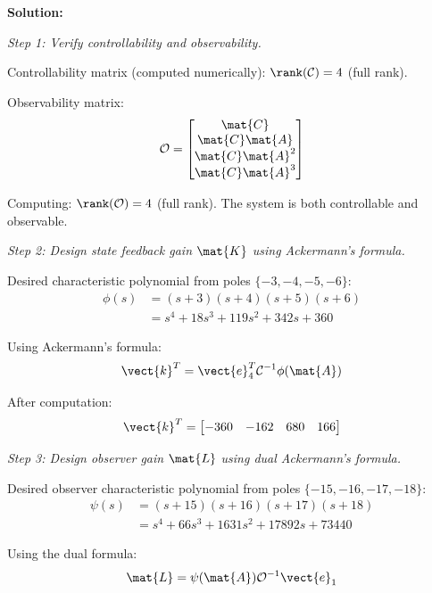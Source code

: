 \textbf{Solution:}

\textit{Step 1: Verify controllability and observability.}

Controllability matrix (computed numerically): $\rank(\mathcal{C}) = 4$ (full rank).

Observability matrix:
\begin{equation}
\mathcal{O} = \begin{bmatrix} \mat{C} \\ \mat{C}\mat{A} \\ \mat{C}\mat{A}^2 \\ \mat{C}\mat{A}^3 \end{bmatrix}
\end{equation}

Computing: $\rank(\mathcal{O}) = 4$ (full rank). The system is both controllable and observable.

\textit{Step 2: Design state feedback gain $\mat{K}$ using Ackermann's formula.}

Desired characteristic polynomial from poles $\{-3, -4, -5, -6\}$:
\begin{align}
\phi(s) &= (s+3)(s+4)(s+5)(s+6) \nonumber \\
&= s^4 + 18s^3 + 119s^2 + 342s + 360
\end{align}

Using Ackermann's formula:
\begin{equation}
\vect{k}^T = \vect{e}_4^T\mathcal{C}^{-1}\phi(\mat{A})
\end{equation}

After computation:
\begin{equation}
\vect{k}^T = \begin{bmatrix} -360 & -162 & 680 & 166 \end{bmatrix}
\end{equation}

\textit{Step 3: Design observer gain $\mat{L}$ using dual Ackermann's formula.}

Desired observer characteristic polynomial from poles $\{-15, -16, -17, -18\}$:
\begin{align}
\psi(s) &= (s+15)(s+16)(s+17)(s+18) \nonumber \\
&= s^4 + 66s^3 + 1631s^2 + 17892s + 73440
\end{align}

Using the dual formula:
\begin{equation}
\mat{L} = \psi(\mat{A})\mathcal{O}^{-1}\vect{e}_1
\end{equation}

